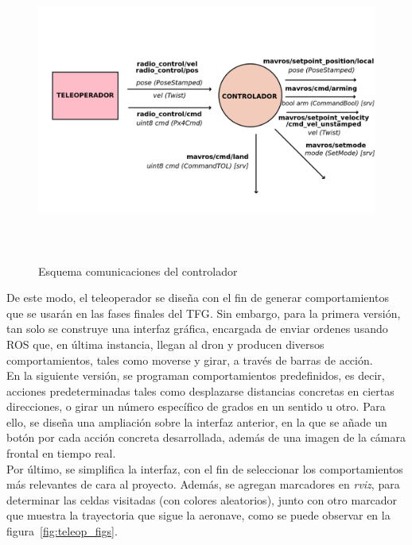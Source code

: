\begin{figure} [t]
	\begin{center}
	\includegraphics[height=10cm]{imagenes/cap4/4_esquema_coms.png}
	\end{center}
	\caption[Esquema comunicaciones del controlador]{Esquema comunicaciones del controlador}
	\label{fig:diagrama}
\end{figure}

De este modo, el teleoperador se diseña con el fin de generar comportamientos que se usarán en las fases finales del \ac{TFG}. Sin embargo, para la primera versión, tan solo se construye una interfaz gráfica, encargada de enviar ordenes usando \ac{ROS} que, en última instancia, llegan al dron y producen diversos comportamientos, tales como moverse y girar, a través de barras de acción.\\

En la siguiente versión, se programan comportamientos predefinidos, es decir, acciones predeterminadas tales como desplazarse distancias concretas en ciertas direcciones, o girar un número específico de grados en un sentido u otro. Para ello, se diseña una ampliación sobre la interfaz anterior, en la que se añade un botón por cada acción concreta desarrollada, además de una imagen de la cámara frontal en tiempo real.\\

Por último, se simplifica la interfaz, con el fin de seleccionar los comportamientos más relevantes de cara al proyecto. Además, se agregan marcadores en \emph{rviz}, para determinar las celdas visitadas (con colores aleatorios), junto con otro marcador que muestra la trayectoria que sigue la aeronave, como se puede observar en la figura~\ref{fig:teleop_figs}.\\


